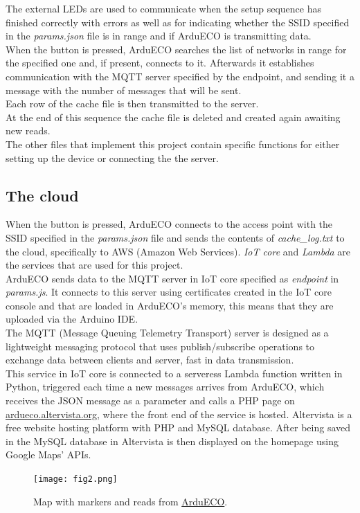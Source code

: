 \documentclass[conference]{IEEEtran}
\begin{document}
		The external LEDs are used to communicate when the setup sequence has finished correctly with errors as well as for indicating whether the SSID specified in the \textit{params.json} file is in range and if ArduECO is transmitting data.\\
		When the button is pressed, ArduECO searches the list of networks in range for the specified one and, if present, connects to it.
		Afterwards it establishes communication with the MQTT server specified by the endpoint, and sending it a message with the number of messages that will be sent.\\
		Each row of the cache file is then transmitted to the server.\\
		At the end of this sequence the cache file is deleted and created again awaiting new reads.\\
		The other files that implement this project contain specific functions for either setting up the device or connecting the the server.
		
	\subsection{The cloud}
	
		When the button is pressed, ArduECO connects to the access point with the SSID specified in the \textit{params.json} file and sends the contents of \textit{cache\_log.txt} to the cloud, specifically to AWS (Amazon Web Services).
		\textit{IoT core} and \textit{Lambda} are the services that are used for this project.\\
		ArduECO sends data to the MQTT server in IoT core specified as \textit{endpoint} in \textit{params.js}.
		It connects to this server using certificates created in the IoT core console and that are loaded in ArduECO's memory, this means that they are uploaded via the Arduino IDE.\\
		The MQTT (Message Queuing Telemetry Transport) server is designed as a lightweight messaging protocol that uses publish/subscribe operations to exchange data between clients and server, fast in data transmission\cite{mqtt}.\\
		This service in IoT core is connected to a serveress Lambda function written in Python, triggered each time a new messages arrives from ArduECO, which receives the JSON message as a parameter and calls a PHP page on \href{ardueco.altervista.org}{ardueco.altervista.org}, where the front end of the service is hosted.
		Altervista is a free website hosting platform with PHP and MySQL database.
		After being saved in the MySQL database in Altervista is then displayed on the homepage using Google Maps' APIs.
		\begin{figure}[htbp] %
			\centerline{\texttt{[image: fig2.png]}}
			\caption{Map with markers and reads from \href{ardueco.altervista.org}{ArduECO}.}
			\label{altervista}
		\end{figure}
	
\end{document}
